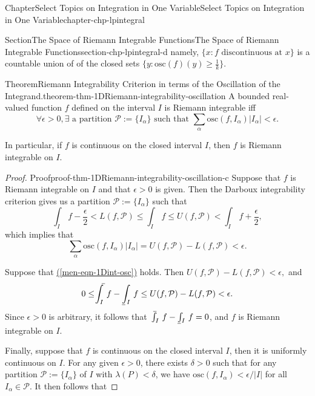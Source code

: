 \documentclass[oneside,10pt,]{book}
\makeatletter
\newcommand{\xreffont}{\relax}
\numberwithin{equation}{section}
\newcommand{\cP}{\mathcal{P}}
\newcommand{\osc}{\text{osc}}
\def\upint{\mathchoice
    {\mkern10mu\overline{\vphantom{\intop}\mkern7mu}\mkern-24mu}
    {\mkern7mu\overline{\vphantom{\intop}\mkern7mu}\mkern-14mu}
    {\mkern7mu\overline{\vphantom{\intop}\mkern7mu}\mkern-14mu}
    {\mkern7mu\overline{\vphantom{\intop}\mkern7mu}\mkern-14mu}
  \int}
\def\lowint{\relax\if@display
 \mkern3mu\underline{\vphantom{\intop}\mkern7mu}\mkern-10mu\int
\else 
\underline{\vphantom{\int}\mkern7mu}\mkern-10mu\int
\fi}
\makeatother
\begin{document}
\begin{chapterptx}{Chapter}{Select Topics on Integration in One Variable}{}{Select Topics on Integration in One Variable}{}{}{chapter-chp-lpintegral}
\begin{sectionptx}{Section}{The Space of Riemann Integrable Functions}{}{The Space of Riemann Integrable Functions}{}{}{section-chp-lpintegral-d}
namely, \(\{x: f \text{ discontinuous at } x\}\) is a countable union of of the closed sets \(\{y: \osc(f)(y)\ge \frac 1k\}\).%
\begin{theorem}{Theorem}{Riemann Integrability Criterion in terms of the Oscillation of the Integrand.}{}{theorem-thm-1DRiemann-integrability-oscillation}%
A bounded real-valued function \(f\) defined on the interval \(I\) is Riemann integrable iff%
\begin{equation}
\forall \epsilon >0, \exists  \text{ a partition }
\cP:=\{I_{\alpha}\} \text{ such that } 
\sum_{\alpha} \osc(f,I_{\alpha})\vert I_{\alpha} \vert < \epsilon.\label{men-eqn-1Dint-osc}
\end{equation}
%
\par
In particular, if \(f\) is continuous on the closed interval \(I\), then \(f\) is Riemann integrable on \(I\).%
\end{theorem}
\begin{proof}{Proof}{}{proof-thm-1DRiemann-integrability-oscillation-c}
Suppose that \(f\) is Riemann integrable on \(I\) and that \(\epsilon>0\) is given. Then the Darboux integrability criterion gives us a partition \(\cP:=\{I_{\alpha}\}\) such that%
\begin{equation*}
\int_{I}\, f -\frac{\epsilon}{2} < L(f, \cP)\le \int_{I}\, f \le 
U (f, \cP)  < \int_{I}\, f  + \frac{\epsilon}{2},
\end{equation*}
which implies that%
\begin{equation*}
\sum_{\alpha} \osc(f,I_{\alpha})\vert I_{\alpha} \vert
=U (f, \cP)-L (f, \cP) < \epsilon.
\end{equation*}
%
\par
Suppose that \hyperref[men-eqn-1Dint-osc]{({\xreffont\ref{men-eqn-1Dint-osc}})} holds. Then \(U (f, \cP)-L (f, \cP) < \epsilon,\)  and%
\begin{equation*}
0\le \upint_{I}\, f  -\lowint_{I} \, f  \le U (f, \cP)-L (f, \cP) < \epsilon.
\end{equation*}
Since \(\epsilon >0\) is arbitrary, it follows that \(\upint_{I}\, f -\lowint_{I} \, f=0\),  and \(f\) is Riemann integrable on \(I\).%
\par
Finally, suppose that \(f\) is continuous on the closed interval \(I\), then it is uniformly continuous on \(I\). For any given \(\epsilon >0\), there exists \(\delta >0\) such that for any partition \(\cP:=\{I_{\alpha}\}\) of \(I\) with \(\lambda (P) < \delta\), we have \(\osc(f, I_{\alpha}) < \epsilon/\vert I\vert\) for all \(I_{\alpha} \in \cP\). It then follows that%

\end{proof}
\end{sectionptx}
\end{chapterptx}
\end{document}
